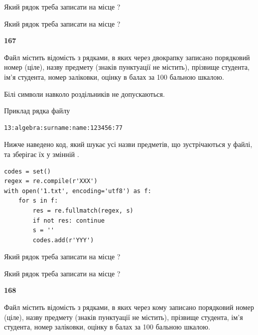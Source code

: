 Який рядок треба записати на місце  ?\par
\vspace{5mm}


Який рядок треба записати на місце  ?\par


\newpage

{\begin {center}\textbf{ 167}\end {center}}\par
Файл  містить відомість з рядками, в яких через двокрапку записано поряд\-ковий номер (ціле), назву предмету (знаків пунктуації не містить), прізвище студента, ім'я студента, номер заліковки, оцінку в балах за 100 бальною шкалою.

Білі символи навколо роздільників не допускаються.

Приклад рядка файлу



\begin{verbatim}
13:algebra:surname:name:123456:77
\end{verbatim}


Нижче наведено код, який шукає усі назви предметів, що зустрічаються у файлі, та зберігає їх у змінній .



\begin{verbatim}
codes = set()
regex = re.compile(r'XXX')
with open('1.txt', encoding='utf8') as f:
    for s in f:
        res = re.fullmatch(regex, s)
        if not res: continue
        s = ''
        codes.add(r'YYY')
\end{verbatim}





Який рядок треба записати на місце  ?\par
\vspace{5mm}


Який рядок треба записати на місце  ?\par


\newpage

{\begin {center}\textbf{ 168}\end {center}}\par
Файл  містить відомість з рядками, в яких через кому записано поряд\-ковий номер (ціле), назву предмету (знаків пунктуації не містить), прізвище студента, ім'я студента, номер заліковки, оцінку в балах за 100 бальною шкалою.

